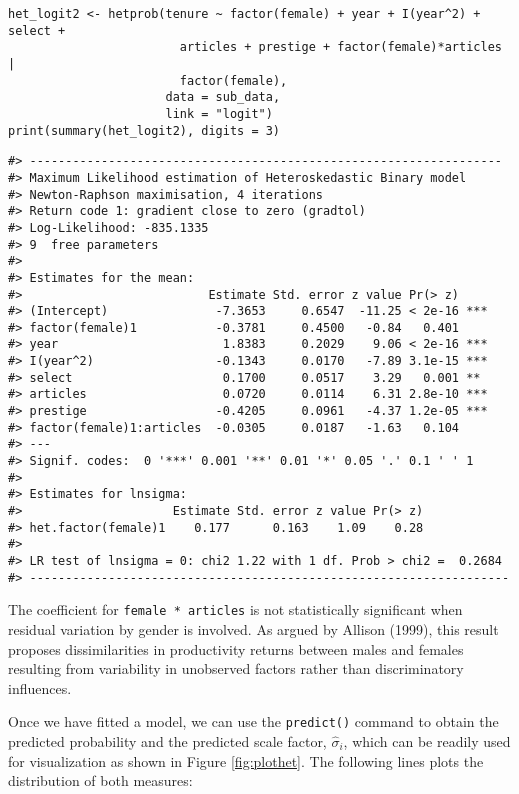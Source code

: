 \begin{verbatim}
het_logit2 <- hetprob(tenure ~ factor(female) + year + I(year^2) + select +  
                        articles + prestige + factor(female)*articles | 
                        factor(female), 
                      data = sub_data, 
                      link = "logit")
print(summary(het_logit2), digits = 3)
\end{verbatim}

\begin{verbatim}
#> ------------------------------------------------------------------
#> Maximum Likelihood estimation of Heteroskedastic Binary model 
#> Newton-Raphson maximisation, 4 iterations
#> Return code 1: gradient close to zero (gradtol)
#> Log-Likelihood: -835.1335 
#> 9  free parameters
#> 
#> Estimates for the mean:
#>                          Estimate Std. error z value Pr(> z)    
#> (Intercept)               -7.3653     0.6547  -11.25 < 2e-16 ***
#> factor(female)1           -0.3781     0.4500   -0.84   0.401    
#> year                       1.8383     0.2029    9.06 < 2e-16 ***
#> I(year^2)                 -0.1343     0.0170   -7.89 3.1e-15 ***
#> select                     0.1700     0.0517    3.29   0.001 ** 
#> articles                   0.0720     0.0114    6.31 2.8e-10 ***
#> prestige                  -0.4205     0.0961   -4.37 1.2e-05 ***
#> factor(female)1:articles  -0.0305     0.0187   -1.63   0.104    
#> ---
#> Signif. codes:  0 '***' 0.001 '**' 0.01 '*' 0.05 '.' 0.1 ' ' 1
#> 
#> Estimates for lnsigma:
#>                     Estimate Std. error z value Pr(> z)
#> het.factor(female)1    0.177      0.163    1.09    0.28
#> 
#> LR test of lnsigma = 0: chi2 1.22 with 1 df. Prob > chi2 =  0.2684 
#> -------------------------------------------------------------------
\end{verbatim}

The coefficient for \texttt{female\ *\ articles} is not statistically significant when residual variation by gender is involved. As argued by Allison (1999), this result proposes dissimilarities in productivity returns between males and females resulting from variability in unobserved factors rather than discriminatory influences.

Once we have fitted a model, we can use the \texttt{predict()} command to obtain the predicted probability and the predicted scale factor, \(\widehat{\sigma}_i\), which can be readily used for visualization as shown in Figure \ref{fig:plothet}. The following lines plots the distribution of both measures:

